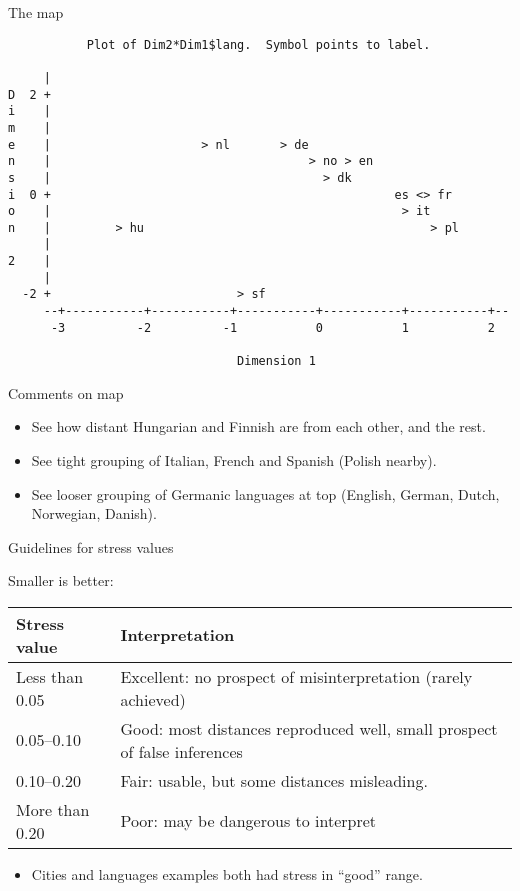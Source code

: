 \documentclass[pdf]{prosper}
\begin{document}
\begin{slide}{The map}

{\scriptsize
\begin{verbatim}
           Plot of Dim2*Dim1$lang.  Symbol points to label.

     |
D  2 +
i    |
m    |
e    |                     > nl       > de
n    |                                    > no > en
s    |                                      > dk
i  0 +                                                es <> fr
o    |                                                 > it
n    |         > hu                                        > pl
     |
2    |
     |
  -2 +                          > sf
     --+-----------+-----------+-----------+-----------+-----------+--
      -3          -2          -1           0           1           2

                                Dimension 1
\end{verbatim}
}
  
\end{slide}

\begin{slide}{Comments on map}

  \begin{itemize}
  \item See how distant Hungarian and Finnish are from each other, and the rest.
  \item See tight grouping of Italian, French and Spanish (Polish nearby).
  \item See looser grouping of Germanic languages at top (English, German, Dutch, Norwegian, Danish). 
  \end{itemize}
  
\end{slide}

\begin{slide}{Guidelines for stress values}

Smaller is better:

\begin{tabular}{lp{3in}}
  Stress value & Interpretation \\
  \hline
  Less than 0.05 & Excellent: no prospect of misinterpretation (rarely achieved)\\
  0.05--0.10 & Good: most distances reproduced well, small prospect of false inferences\\
0.10--0.20 & Fair: usable, but some distances misleading.\\
More than 0.20 & Poor: may be dangerous to interpret\\
\hline
\end{tabular}

\begin{itemize}
\item Cities and languages examples both had stress in ``good'' range.
\end{itemize}
  
\end{slide}
\end{document}
